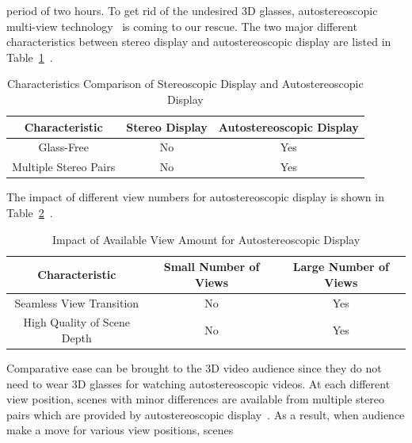 period of two hours.
To get rid of the undesired 3D glasses,
autostereoscopic multi-view technology~\parencite{RN153} is coming to
our rescue.
The two major different characteristics between stereo display and
autostereoscopic display are
listed in Table~\ref{tab:diff-stereo-autostereo}~\parencite{RN44}.
\begin{table}[b]
    \caption{Characteristics Comparison of Stereoscopic Display and Autostereoscopic Display}
    \bigskip
    \label{tab:diff-stereo-autostereo}
    \centering
    \begin{tabular}{c c c}
        \hline
        Characteristic & Stereo Display & Autostereoscopic Display\\
        \hline
        Glass-Free & No & Yes \\
        Multiple Stereo Pairs & No & Yes \\
        \hline
    \end{tabular}
\end{table}
The impact of different view numbers for autostereoscopic display is shown in
Table~\ref{tab:autostereo-less-views-more-views}~\parencite{RN44}.
\begin{table}
    \caption{Impact of Available View Amount for Autostereoscopic Display}
    \bigskip
    \label{tab:autostereo-less-views-more-views}
    \centering
    \begin{tabular}{c c c}
        \hline
        Characteristic & Small Number of Views & Large Number of Views \\
        \hline
        Seamless View Transition  & No & Yes \\
        High Quality of Scene Depth & No & Yes \\
        \hline
    \end{tabular}
\end{table}
Comparative ease can be brought to the 3D video audience
since they do not need to wear 3D glasses for watching autostereoscopic videos.
At each different view position, scenes with minor differences are available
from multiple stereo pairs which are provided by autostereoscopic
display~\parencite{RN44}.
As a result, when audience make a move for various view positions, scenes
